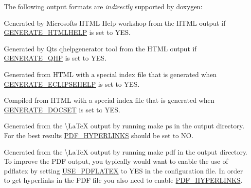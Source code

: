 The following output formats are {\itshape indirectly} supported by doxygen\+: 
\begin{DoxyDescription}
\item[{\bfseries{Compiled H\+T\+ML Help}} (a.\+k.\+a. Windows 98 help) ]Generated by Microsoft\textquotesingle{}s H\+T\+ML Help workshop from the H\+T\+ML output if \mbox{\hyperlink{config_cfg_generate_htmlhelp}{G\+E\+N\+E\+R\+A\+T\+E\+\_\+\+H\+T\+M\+L\+H\+E\+LP}} is set to {\ttfamily Y\+ES}. 
\item[{\bfseries{Qt Compressed Help (.qch)}} ]Generated by Qt\textquotesingle{}s qhelpgenerator tool from the H\+T\+ML output if \mbox{\hyperlink{config_cfg_generate_qhp}{G\+E\+N\+E\+R\+A\+T\+E\+\_\+\+Q\+HP}} is set to {\ttfamily Y\+ES}. 
\item[{\bfseries{Eclipse Help}} ]Generated from H\+T\+ML with a special index file that is generated when \mbox{\hyperlink{config_cfg_generate_eclipsehelp}{G\+E\+N\+E\+R\+A\+T\+E\+\_\+\+E\+C\+L\+I\+P\+S\+E\+H\+E\+LP}} is set to {\ttfamily Y\+ES}. 
\item[{\bfseries{X\+Code \mbox{\hyperlink{class_doc_sets}{Doc\+Sets}}}} ]Compiled from H\+T\+ML with a special index file that is generated when \mbox{\hyperlink{config_cfg_generate_docset}{G\+E\+N\+E\+R\+A\+T\+E\+\_\+\+D\+O\+C\+S\+ET}} is set to {\ttfamily Y\+ES}. 
\item[{\bfseries{Post\+Script}} ]Generated from the \textbackslash{}\+La\+TeX output by running {\ttfamily make ps} in the output directory. For the best results \mbox{\hyperlink{config_cfg_pdf_hyperlinks}{P\+D\+F\+\_\+\+H\+Y\+P\+E\+R\+L\+I\+N\+KS}} should be set to {\ttfamily NO}. 
\item[{\bfseries{P\+DF}} ]Generated from the \textbackslash{}\+La\+TeX output by running {\ttfamily make pdf} in the output directory. To improve the P\+DF output, you typically would want to enable the use of {\ttfamily pdflatex} by setting \mbox{\hyperlink{config_cfg_use_pdflatex}{U\+S\+E\+\_\+\+P\+D\+F\+L\+A\+T\+EX}} to {\ttfamily Y\+ES} in the configuration file. In order to get hyperlinks in the P\+DF file you also need to enable \mbox{\hyperlink{config_cfg_pdf_hyperlinks}{P\+D\+F\+\_\+\+H\+Y\+P\+E\+R\+L\+I\+N\+KS}}. 
\end{DoxyDescription}

 